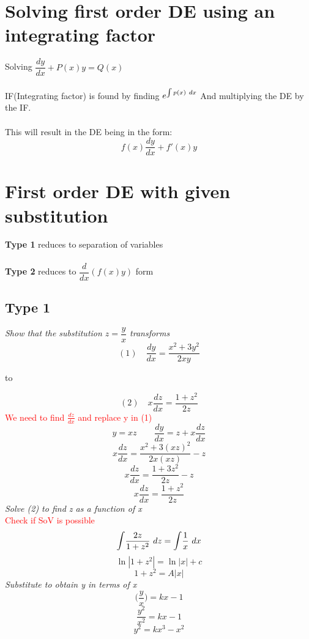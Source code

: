 \documentclass{article}[18pt]
\begin{document}
\section{Solving first order DE using an integrating factor}
Solving $\dfrac{dy}{dx}+P(x)y=Q(x)$\\
\\
IF(Integrating factor) is found by finding $\mathlarger{e^{\int p(x) \ dx}}$ And multiplying the DE by the IF.\\
\\
This will result in the DE being in the form:
$$f(x)\frac{dy}{dx}+f'(x)y$$
\section{First order DE with given substitution}
\textbf{Type 1} reduces to separation of variables\\
\\
\textbf{Type 2} reduces to $\dfrac{d}{dx}(f(x)y)$ form\\
\subsection{Type 1}
\textit{Show that the substitution $z=\dfrac{y}{x}$ transforms}
$$(1)\quad \frac{dy}{dx}=\frac{x^2+3y^2}{2xy}$$
\begin{center}
to
\end{center}
$$(2)\quad x\frac{dz}{dx}=\frac{1+z^2}{2z}$$
\textcolor{red}{We need to find $\frac{dz}{dx}$ and replace y in (1)}\\
$$y=xz \quad \quad \frac{dy}{dx}=z+x\frac{dz}{dx}$$
$$x\frac{dz}{dx}=\frac{x^2+3(xz)^2}{2x(xz)}-z$$
$$x\frac{dz}{dx}=\frac{1+3z^2}{2z}-z$$
$$x\frac{dz}{dx}=\frac{1+z^2}{2z}$$
\textit{Solve (2) to find z as a function of x}\\
\textcolor{red}{Check if SoV is possible}\\
$$\mathlarger{\int}\frac{2z}{1+z^2} \ dz=\mathlarger{\int}\frac{1}{x} \ dx$$
$$\ln|1+z^2|=\ln|x|+c$$
$$1+z^2=A|x|$$
\textit{Substitute to obtain y in terms of x}\\
$$\Bigg(\frac{y}{x}\Bigg)=kx-1$$
$$\frac{y^2}{x^2}=kx-1$$
$$y^2=kx^3-x^2$$
\end{document}
